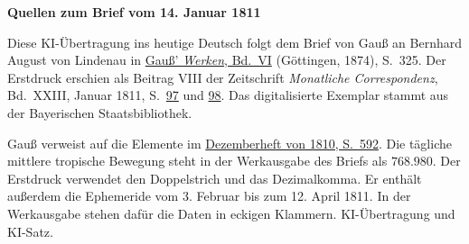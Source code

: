 \clearpage\thispagestyle{empty}
\begin{center}\textbf{Quellen zum Brief vom 14. Januar 1811}\end{center}
\noindent Diese KI-Übertragung ins heutige Deutsch folgt dem Brief von Gauß an Bernhard August von Lindenau in \href{https://gdz.sub.uni-goettingen.de/id/PPN236007467}{Gauß’ \textit{Werken}, Bd.~VI} (Göttingen, 1874), S.~325. Der Erstdruck erschien als Beitrag VIII der Zeitschrift \textit{Monatliche Correspondenz}, Bd.~XXIII, Januar 1811, S.~\href{https://api.digitale-sammlungen.de/iiif/image/v2/bsb10538612_00105/full/1600,/0/default.jpg}{97} und \href{https://api.digitale-sammlungen.de/iiif/image/v2/bsb10538612_00106/full/1600,/0/default.jpg}{98}. Das digitalisierte Exemplar stammt aus der Bayerischen Staatsbibliothek.
\par\smallskip\noindent Gauß verweist auf die Elemente im \href{https://archive.org/download/bub_gb_YCI4AAAAMAAJ/page/n595.jpg}{Dezemberheft von 1810, S.~592}. Die tägliche mittlere tropische Bewegung steht in der Werkausgabe des Briefs als $768.980$. Der Erstdruck verwendet den Doppelstrich und das Dezimalkomma. Er enthält außerdem die Ephemeride vom 3. Februar bis zum 12. April 1811. In der Werkausgabe stehen dafür die Daten in eckigen Klammern. KI-Übertragung und KI-Satz.
\clearpage
